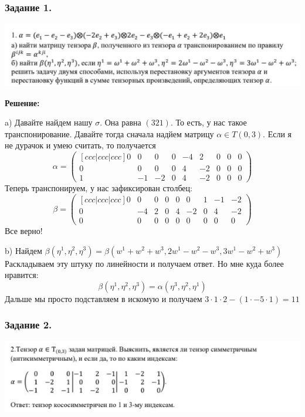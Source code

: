\subsubsection{Задание 1.}

\begin{center}
   \includegraphics{assets/homework-3-task-1.jpg}
\end{center}

\textbf{Решение:}

a) Давайте найдем нашу $\sigma$. Она равна $(321)$. То есть, у нас такое транспонирование. Давайте тогда сначала надйем матрицу $\alpha \in T(0,3)$.
Если я не дурачок и умею считать,  то получается
$$\alpha  =\begin{pmatrix}[ccc|ccc|ccc]
    0 & 0 & 0 & 0 &-4 & 2 & 0 & 0 & 0 \\
    0 & 0 & 0 & 0 &4 & -2 & 0 & 0 & 0\\
    1 & -1 & -2 & 0 &4 & -2 & 0 & 0 & 0
\end{pmatrix}$$
Теперь транспонируем, у нас зафиксирован столбец:
$$\beta = \begin{pmatrix}[ccc|ccc|ccc]
     0 & 0 & 0 & 0 &0 & 0 & 1 & -1 & -2 \\
    0 & -4 & 2 & 0 &4 & -2 & 0 & 4 & -2\\
    0 & 0 & 0 & 0 &0 & 0 & 0 & 0 & 0
\end{pmatrix}$$
Все верно!

b) Найдем $\beta(\eta^1,\eta^2,\eta^3) = \beta(w^1 + w^2 + w^3, 2w^1-w^2-w^3,3w^1 -w^2 +w^3)$
Раскладываем эту штуку по линейности и получаем ответ. Но мне куда более нравится:
$$\beta(\eta^1,\eta^2,\eta^3) = \alpha(\eta^3,\eta^2,\eta^1)$$
Дальше мы просто подставляем в искомую и получаем $3\cdot 1\cdot2 - (1\cdot -5\cdot 1 ) = 11$

\subsubsection{Задание 2.}

\begin{center}
   \includegraphics{assets/homework-3-task-2.jpg}
\end{center}

